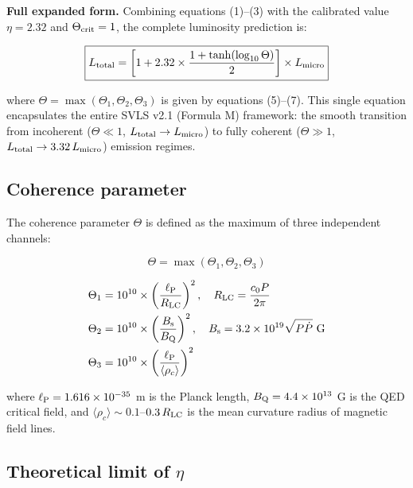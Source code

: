 \documentclass[10pt,twocolumn]{article}
\begin{document}
\textbf{Full expanded form.} Combining equations (1)--(3) with the calibrated value $\eta = 2.32$ and $\Theta_{\rm crit} = 1$, the complete luminosity prediction is:

\begin{equation}
\boxed{ L_{\rm total} = \left[ 1 + 2.32 \times \frac{1 + \tanh(\log_{10}\Theta)}{2} \right] \times L_{\rm micro} }
\label{eq:full}
\end{equation}

where $\Theta = \max(\Theta_1, \Theta_2, \Theta_3)$ is given by equations (5)--(7). This single equation encapsulates the entire SVLS v2.1 (Formula M) framework: the smooth transition from incoherent ($\Theta \ll 1$, $L_{\rm total} \to L_{\rm micro}$) to fully coherent ($\Theta \gg 1$, $L_{\rm total} \to 3.32 \, L_{\rm micro}$) emission regimes.

\subsection{Coherence parameter}

The coherence parameter $\Theta$ is defined as the maximum of three independent channels:

\begin{equation}
\Theta = \max(\Theta_1, \Theta_2, \Theta_3)
\label{eq:Theta}
\end{equation}

\begin{align}
\Theta_1 &= 10^{10} \times \left(\frac{\ell_{\rm P}}{R_{\rm LC}}\right)^2, \quad R_{\rm LC} = \frac{c_0 P}{2\pi} \label{eq:Theta1} \\
\Theta_2 &= 10^{10} \times \left(\frac{B_{\rm s}}{B_{\rm Q}}\right)^2, \quad B_{\rm s} = 3.2 \times 10^{19} \sqrt{P\dot{P}}\ \text{G} \label{eq:Theta2} \\
\Theta_3 &= 10^{10} \times \left(\frac{\ell_{\rm P}}{\langle\rho_c\rangle}\right)^2 \label{eq:Theta3}
\end{align}

where $\ell_{\rm P} = 1.616 \times 10^{-35}$ m is the Planck length, $B_{\rm Q} = 4.4 \times 10^{13}$ G is the QED critical field, and $\langle\rho_c\rangle \sim 0.1$--$0.3\,R_{\rm LC}$ is the mean curvature radius of magnetic field lines.

\subsection{Theoretical limit of $\eta$}
\end{document}
